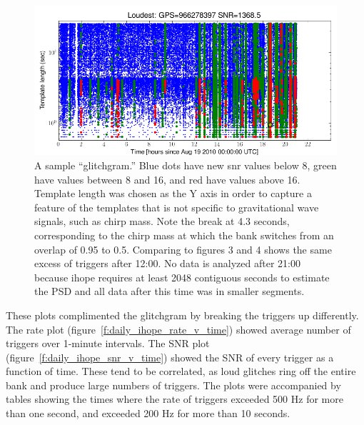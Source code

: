 \begin{figure}
  \includegraphics[width=\linewidth]{figures/detchar/H1_1_UNCLUSTERED_glitchgram.png}
  \caption[The Aug 19th daily ihope ``glitchgram'']{
  \label{f:daily_ihope_glitchgram}
A sample ``glitchgram.'' Blue dots have
new snr values below 8, green have values between 8 and 16,
and red have values above 16.  Template length was chosen as the Y
axis in order to capture a feature of the templates that is not
specific to gravitational wave signals, such as chirp mass.
Note the break at 4.3 seconds, corresponding to the
chirp mass at which the bank switches from an overlap of 0.95 to 0.5.
Comparing to figures 3 and 4 shows the same 
excess of triggers after 12:00.  No data is analyzed after 21:00
because ihope requires at least 2048 contiguous seconds to estimate
the PSD and all data after this time was in smaller segments.}
\end{figure}%



These plots complimented the glitchgram by breaking the triggers up
differently.  The rate plot (figure~\ref{f:daily_ihope_rate_v_time})
showed average number of triggers over 1-minute intervals.  The SNR
plot (figure~\ref{f:daily_ihope_snr_v_time}) showed the SNR of every
trigger as a function of time.  These tend to be correlated, as loud
glitches ring off the entire bank and produce large numbers of
triggers.  The plots were accompanied by tables showing the times
where the rate of triggers exceeded 500 Hz for more than one second,
and exceeded 200 Hz for more than 10 seconds.

